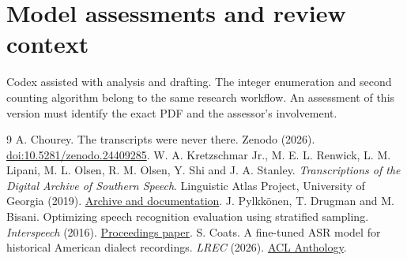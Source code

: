\documentclass[11pt]{article}
\begin{document}
\section*{Model assessments and review context}
Codex assisted with analysis and drafting. The integer enumeration and second counting algorithm belong to the same research workflow. An assessment of this version must identify the exact PDF and the assessor's involvement.
\begin{thebibliography}{9}
 A. Chourey. The transcripts were never there. Zenodo (2026). \href{https://doi.org/10.5281/zenodo.24409285}{doi:10.5281/zenodo.24409285}.
 W. A. Kretzschmar Jr., M. E. L. Renwick, L. M. Lipani, M. L. Olsen, R. M. Olsen, Y. Shi and J. A. Stanley. \emph{Transcriptions of the Digital Archive of Southern Speech}. Linguistic Atlas Project, University of Georgia (2019). \href{https://www.lap.uga.edu/Projects/DASS2019/}{Archive and documentation}.
 J. Pylkk\"onen, T. Drugman and M. Bisani. Optimizing speech recognition evaluation using stratified sampling. \emph{Interspeech} (2016). \href{https://www.isca-archive.org/interspeech_2016/pylkkonen16_interspeech.pdf}{Proceedings paper}.
 S. Coats. A fine-tuned ASR model for historical American dialect recordings. \emph{LREC} (2026). \href{https://aclanthology.org/2026.lrec-1.107/}{ACL Anthology}.
\end{thebibliography}
\end{document}
